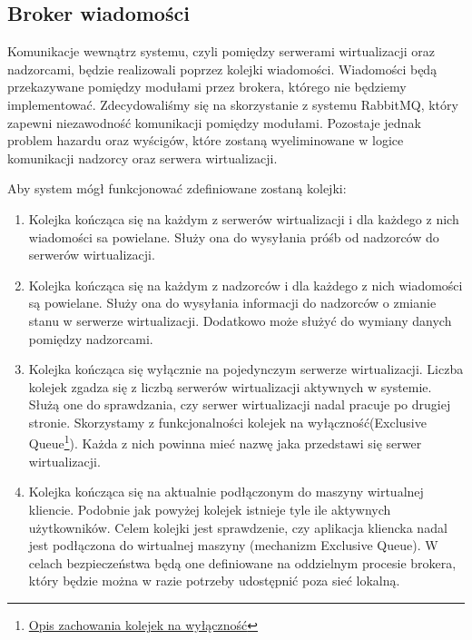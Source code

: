 \documentclass[../deliverable-two.tex]{subfiles}
\begin{document}
\label{external-modules}

\subsection{Broker wiadomości}
\label{external-modules:broker}

Komunikacje wewnątrz systemu, czyli pomiędzy serwerami wirtualizacji oraz nadzorcami, będzie realizowali poprzez kolejki wiadomości.
Wiadomości będą przekazywane pomiędzy modułami przez brokera, którego nie będziemy implementować.
Zdecydowaliśmy się na skorzystanie z systemu RabbitMQ, który zapewni niezawodność komunikacji pomiędzy modułami.
Pozostaje jednak problem hazardu oraz wyścigów, które zostaną wyeliminowane w logice komunikacji nadzorcy oraz serwera wirtualizacji.

Aby system mógł funkcjonować zdefiniowane zostaną kolejki:
\begin{enumerate}[label=(\Roman*)]
	\item \label{external-modules:broker:queue-virtsrv} Kolejka kończąca się na każdym z serwerów wirtualizacji i dla każdego z nich wiadomości sa powielane.
	      Służy ona do wysyłania próśb od nadzorców do serwerów wirtualizacji.
	\item \label{external-modules:broker:queue-overseers} Kolejka kończąca się na każdym z nadzorców i dla każdego z nich wiadomości są powielane.
	      Służy ona do wysyłania informacji do nadzorców o zmianie stanu w serwerze wirtualizacji.
	      Dodatkowo może służyć do wymiany danych pomiędzy nadzorcami.
	\item \label{external-modules:broker:queue-exclusive} Kolejka kończąca się wyłącznie na pojedynczym serwerze wirtualizacji.
	      Liczba kolejek zgadza się z liczbą serwerów wirtualizacji aktywnych w systemie.
	      Służą one do sprawdzania, czy serwer wirtualizacji nadal pracuje po drugiej stronie.
	      Skorzystamy z funkcjonalności kolejek na wyłączność(Exclusive Queue\footnote{\href{https://www.rabbitmq.com/queues.html\#exclusive-queues}{Opis zachowania kolejek na wyłączność}}).
	      Każda z nich powinna mieć nazwę jaka przedstawi się serwer wirtualizacji.
	\item \label{external-modules:broker:queue-users} Kolejka kończąca się na aktualnie podłączonym do maszyny wirtualnej kliencie.
		  Podobnie jak powyżej kolejek istnieje tyle ile aktywnych użytkowników.
		  Celem kolejki jest sprawdzenie, czy aplikacja kliencka nadal jest podłączona do wirtualnej maszyny (mechanizm Exclusive Queue).
		  W celach bezpieczeństwa będą one definiowane na oddzielnym procesie brokera, który będzie można w razie potrzeby udostępnić poza sieć lokalną.
\end{enumerate}
\end{document}
